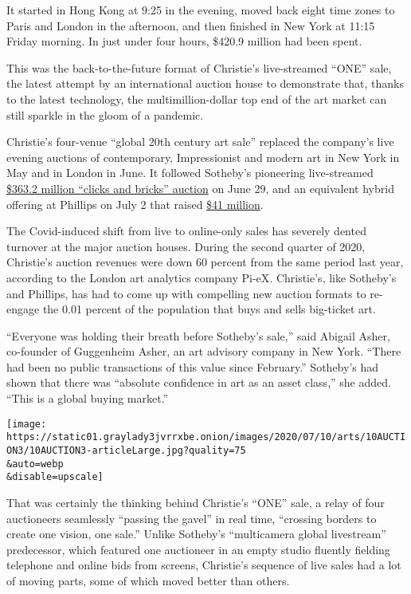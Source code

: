 It started in Hong Kong at 9:25 in the evening, moved back eight time
zones to Paris and London in the afternoon, and then finished in New
York at 11:15 Friday morning. In just under four hours, \$420.9 million
had been spent.

This was the back-to-the-future format of Christie's live-streamed
``ONE'' sale, the latest attempt by an international auction house to
demonstrate that, thanks to the latest technology, the
multimillion-dollar top end of the art market can still sparkle in the
gloom of a pandemic.

Christie's four-venue ``global 20th century art sale'' replaced the
company's live evening auctions of contemporary, Impressionist and
modern art in New York in May and in London in June. It followed
Sotheby's pioneering live-streamed
\href{https://www.nytimes3xbfgragh.onion/2020/06/30/arts/design/sothebys-online-auction.html}{\$363.2
million ``clicks and bricks'' auction} on June 29, and an equivalent
hybrid offering at Phillips on July 2 that raised
\href{https://www.artnews.com/art-news/market/phillips-june-2020-evening-sale-1202693351/}{\$41
million}.

The Covid-induced shift from live to online-only sales has severely
dented turnover at the major auction houses. During the second quarter
of 2020, Christie's auction revenues were down 60 percent from the same
period last year, according to the London art analytics company Pi-eX.
Christie's, like Sotheby's and Phillips, has had to come up with
compelling new auction formats to re-engage the 0.01 percent of the
population that buys and sells big-ticket art.

``Everyone was holding their breath before Sotheby's sale,'' said
Abigail Asher, co-founder of Guggenheim Asher, an art advisory company
in New York. ``There had been no public transactions of this value since
February.'' Sotheby's had shown that there was ``absolute confidence in
art as an asset class,'' she added. ``This is a global buying market.''

\texttt{[image: https://static01.graylady3jvrrxbe.onion/images/2020/07/10/arts/10AUCTION3/10AUCTION3-articleLarge.jpg?quality=75\\\&auto=webp\\\&disable=upscale]}

That was certainly the thinking behind Christie's ``ONE'' sale, a relay
of four auctioneers seamlessly ``passing the gavel'' in real time,
``crossing borders to create one vision, one sale.'' Unlike Sotheby's
``multicamera global livestream'' predecessor, which featured one
auctioneer in an empty studio fluently fielding telephone and online
bids from screens, Christie's sequence of live sales had a lot of moving
parts, some of which moved better than others.

